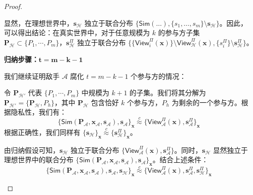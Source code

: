 \begin{proof}
\begin{trivlist}
显然，在理想世界中，$\textbf{s}_{\mathcal{H}}$ 独立于联合分布 $\{\mathsf{Sim}(\dots),\{s_{1},\dots,s_{m}\} \setminus \textbf{s}_\mathcal{H}\}$。因此，可以得出结论：在真实世界中，对于任意规模为 $k$ 的参与方子集 $\textbf{P}_\mathcal{H} \subset \{P_1, \cdots, P_m\}$，$\textbf{s}^\Pi_{\mathcal{H}}$ 独立于联合分布 $\{\{\mathsf{View}_{i}^\Pi(\textbf{x})\} \setminus \mathsf{View}_{\mathcal{H}}^\Pi(\textbf{x}),\{s^\Pi_{i}\} \setminus \textbf{s}^\Pi_{\mathcal{H}}\}$。

\item[$-$] \textbf{归纳步骤：$\mathbf{t = m-k-1}$}

我们继续证明敌手 $\mathcal{A}$ 腐化 $t = m-k-1$ 个参与方的情况：

令 $\textbf{P}_{\mathcal{H}'}$ 代表 $\{P_1, \cdots, P_m\}$ 中规模为 $k+1$ 的子集。我们将其分解为 $\textbf{P}_{\mathcal{H}'} = \{\textbf{P}_{\mathcal{H}}, P_h\}$，其中 $\textbf{P}_\mathcal{H}$ 包含恰好 $k$ 个参与方，$P_h$ 为剩余的一个参与方。根据隐私性，我们有：
\begin{equation*}
    \{\mathsf{Sim}(\textbf{P}_{\mathcal{A}},\textbf{x}_{\mathcal{A}},\textbf{s}_{\mathcal{A}}),\textbf{s}_{\mathcal{A}}\}_{\textbf{x}} \overset{c}{\approx} \{\mathsf{View}_{\mathcal{A}}^\Pi(\textbf{x}),\textbf{s}^\Pi_{\mathcal{A}}\}_{\textbf{x}}
\end{equation*}
根据正确性，我们同样有 $\{\textbf{s}_{\mathcal{H}}\}_{\textbf{x}} \overset{c}{\approx} \{\textbf{s}^\Pi_{\mathcal{H}}\}_{\textbf{x}}$。

由归纳假设可知，$\textbf{s}_\mathcal{H}$ 独立于联合分布 $\{\mathsf{View}_{\mathcal{A}}^\Pi(\textbf{x}),\textbf{s}^\Pi_{\mathcal{A}}\}$。同时，$\textbf{s}_{\mathcal{H}}$ 显然独立于理想世界中的联合分布 $\{\mathsf{Sim}(\textbf{P}_{\mathcal{A}},\textbf{x}_{\mathcal{A}},\textbf{s}_{\mathcal{A}}),\textbf{s}_{\mathcal{A}}\}_{\textbf{x}}$。结合上述条件：
\begin{equation*}
    \{\mathsf{Sim}(\textbf{P}_{\mathcal{A}},\textbf{x}_{\mathcal{A}},\textbf{s}_{\mathcal{A}}),\textbf{s}_{\mathcal{A}},\textbf{s}_{\mathcal{H}}\}_{\textbf{x}} \overset{c}{\approx} \{\mathsf{View}_{\mathcal{A}}^\Pi(\textbf{x}),\textbf{s}^\Pi_{\mathcal{A}},\textbf{s}^\Pi_{\mathcal{H}}\}_{\textbf{x}}
\end{equation*}


\end{trivlist}
\end{proof}
